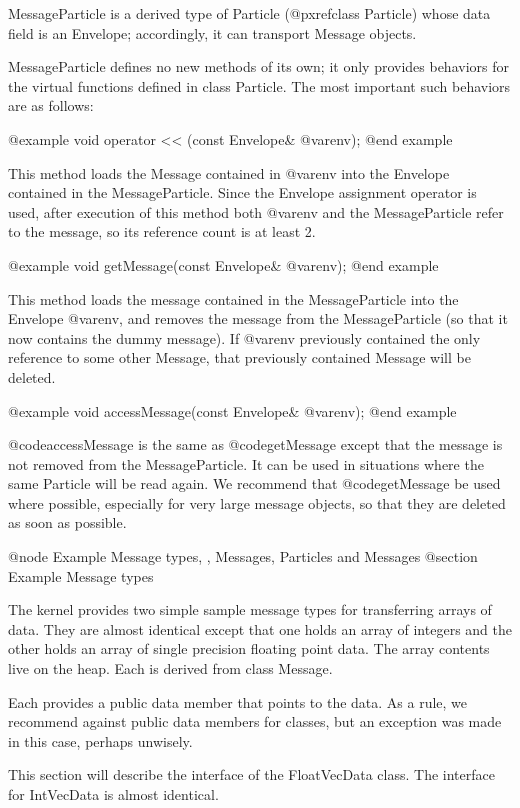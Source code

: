 MessageParticle is a derived type of Particle (@pxref{class Particle})
whose data field is an
Envelope; accordingly, it can transport Message objects.

MessageParticle defines no new methods of its own; it only provides
behaviors for the virtual functions defined in class Particle.
The most important such behaviors are as follows:

@example
void operator << (const Envelope& @var{env});
@end example

This method loads the Message contained in @var{env} into the Envelope
contained in the MessageParticle.  Since the Envelope assignment
operator is used, after execution of this method both @var{env} and
the MessageParticle refer to the message, so its reference count is at
least 2.

@example
void getMessage(const Envelope& @var{env});
@end example

This method loads the message contained in the MessageParticle into the
Envelope @var{env}, and removes the message from the MessageParticle
(so that it now contains the dummy message).  If @var{env} previously
contained the only reference to some other Message, that previously
contained Message will be deleted.

@example
void accessMessage(const Envelope& @var{env});
@end example

@code{accessMessage} is the same as @code{getMessage} except that the
message is not removed from the MessageParticle.  It can be used in
situations where the same Particle will be read again.  We recommend
that @code{getMessage} be used where possible, especially for very
large message objects, so that they are deleted as soon as possible.

@node Example Message types,  , Messages, Particles and Messages
@section Example Message types

The kernel provides two simple sample message types for transferring
arrays of data.  They are almost identical except that one holds an
array of integers and the other holds an array of single precision
floating point data.  The array contents live on the heap.  Each is
derived from class Message.

Each provides a public data member that points to the data.  As a rule,
we recommend against public data members for classes, but an exception
was made in this case, perhaps unwisely.

This section will describe the interface of the FloatVecData class.
The interface for IntVecData is almost identical.

